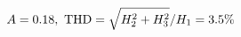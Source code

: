 \documentclass[preview]{standalone}
\begin{document}
\begin{align*}
\special{dvisvgm:raw <g id='unique000'>}A=0.18,\ \text{THD}=\sqrt{H_2^2+H_3^2}/H_1=3.5\%\special{dvisvgm:raw </g>}
\end{align*}
\end{document}

